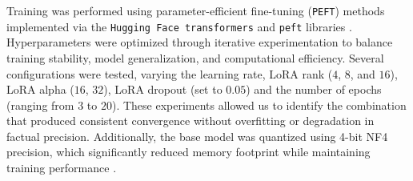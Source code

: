 Training was performed using parameter-efficient fine-tuning (\texttt{PEFT}) methods implemented via the \texttt{Hugging Face transformers} and \texttt{peft} libraries \cite{peft}. Hyperparameters were optimized through iterative experimentation to balance training stability, model generalization, and computational efficiency. Several configurations were tested, varying the learning rate, LoRA rank ($4$, $8$, and $16$), LoRA alpha ($16$, $32$), LoRA dropout (set to $0.05$) and the number of epochs (ranging from $3$ to $20$). These experiments allowed us to identify the combination that produced consistent convergence without overfitting or degradation in factual precision. Additionally, the base model was quantized using 4-bit NF4 precision, which significantly reduced memory footprint while maintaining training performance \cite{qlora_quantization}.

